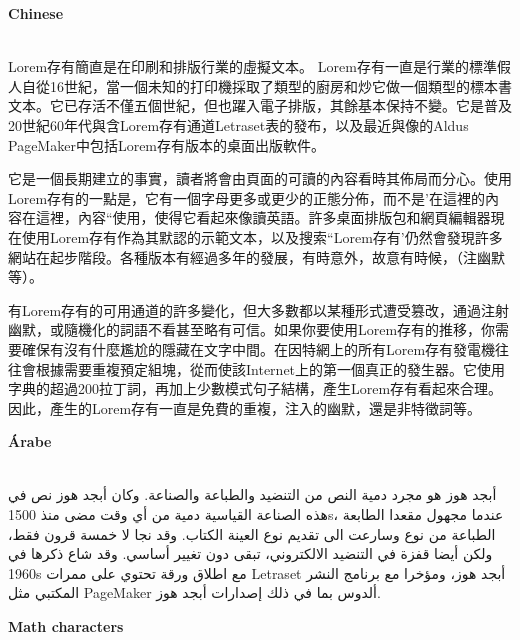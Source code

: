 \documentclass{article}
\begin{document}
\par
\textbf{\huge{}Chinese}\\\\

\par
Lorem存有簡直是在印刷和排版行業的虛擬文本。 Lorem存有一直是行業的標準假人自從16世紀，當一個未知的打印機採取了類型的廚房和炒它做一個類型的標本書文本。它已存活不僅五個世紀，但也躍入電子排版，其餘基本保持不變。它是普及20世紀60年代與含Lorem存有通道Letraset表的發布，以及最近與像的Aldus PageMaker中包括Lorem存有版本的桌面出版軟件。

它是一個長期建立的事實，讀者將會由頁面的可讀的內容看時其佈局而分心。使用Lorem存有的一點是，它有一個字母更多或更少的正態分佈，而不是'在這裡的內容在這裡，內容“使用，使得它看起來像讀英語。許多桌面排版包和網頁編輯器現在使用Lorem存有作為其默認的示範文本，以及搜索“Lorem存有'仍然會發現許多網站在起步階段。各種版本有經過多年的發展，有時意外，故意有時候，（注幽默等）。

有Lorem存有的可用通道的許多變化，但大多數都以某種形式遭受篡改，通過注射幽默，或隨機化的詞語不看甚至略有可信。如果你要使用Lorem存有的推移，你需要確保有沒有什麼尷尬的隱藏在文字中間。在因特網上的所有Lorem存有發電機往往會根據需要重複預定組塊，從而使該Internet上的第一個真正的發生器。它使用字典的超過200拉丁詞，再加上少數模式句子結構，產生Lorem存有看起來合理。因此，產生的Lorem存有一直是免費的重複，注入的幽默，還是非特徵詞等。\\

\par
\textbf{\huge{}Árabe}\\\\

\par
أبجد هوز هو مجرد دمية النص من التنضيد والطباعة والصناعة. وكان أبجد هوز نص في هذه الصناعة القياسية دمية من أي وقت مضى منذ 1500s، عندما مجهول مقعدا الطابعة الطباعة من نوع وسارعت الى تقديم نوع العينة الكتاب. وقد نجا لا خمسة قرون فقط، ولكن أيضا قفزة في التنضيد الالكتروني، تبقى دون تغيير أساسي. وقد شاع ذكرها في 1960s مع اطلاق ورقة تحتوي على ممرات Letraset أبجد هوز، ومؤخرا مع برنامج النشر المكتبي مثل PageMaker ألدوس بما في ذلك إصدارات أبجد هوز.\\

\par
\textbf{\huge{}Math characters}\\\\
\end{document}
